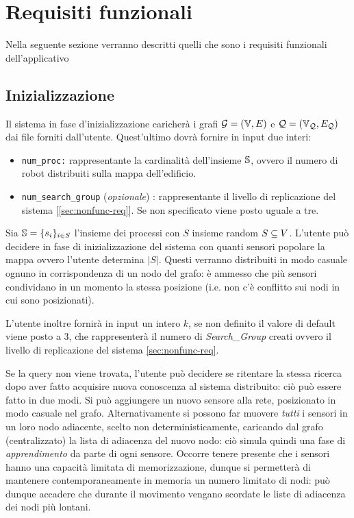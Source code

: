 \documentclass{llncs}
\begin{document}
\section{Requisiti funzionali}
Nella seguente sezione verranno descritti quelli che sono i requisiti funzionali dell'applicativo
\subsection{Inizializzazione}
Il sistema in fase d'inizializzazione caricherà i grafi $\mathcal{G} = ( \mathbb{V}, E)$ e $\mathcal{Q} = (\mathbb{V}_{\mathcal{Q}}, E_{\mathcal{Q}})$ dai 
file forniti dall'utente. Quest'ultimo dovrà fornire in input due interi:
\begin{itemize}
	\item \texttt{num\_proc:} rappresentante la cardinalità dell'insieme $\mathbb{S}$, ovvero il numero di 
	robot distribuiti sulla mappa dell'edificio.
	\item \texttt{num\_search\_group} (\emph{opzionale}) : rappresentante il livello di replicazione del sistema [\ref*{sec:nonfunc-req}]. Se non specificato viene posto uguale a tre.
\end{itemize} 



Sia $\mathbb{S} = \{s_i \}_{i \in S}$ l'insieme dei processi con $S$ insieme random $S \subseteq V$.
L'utente può decidere in fase di inizializzazione del sistema con quanti
sensori popolare la mappa ovvero l'utente determina $|S|$.
 Questi verranno distribuiti in modo casuale
ognuno in corrispondenza di un nodo del grafo: è ammesso che più
sensori condividano in un momento la stessa posizione
(i.e. non c'è conflitto sui nodi in cui sono posizionati). 

L'utente inoltre fornirà in input un intero $k$, se non definito il valore di  default 
viene posto a 3, che rappresenterà il numero di  \emph{Search\_Group} creati ovvero il livello
di replicazione del sistema \ref{sec:nonfunc-req}. 

Se la query non viene trovata, l'utente può decidere se ritentare
la stessa ricerca dopo aver fatto acquisire nuova conoscenza al sistema
distribuito: ciò può essere fatto in due modi.
Si può aggiungere un nuovo sensore alla rete, posizionato in modo
casuale nel grafo. Alternativamente
si possono far muovere \emph{tutti} i sensori in un loro nodo adiacente,
scelto non deterministicamente, caricando dal grafo (centralizzato)
la lista di adiacenza del nuovo nodo: ciò simula quindi una fase di
\emph{apprendimento} da parte di ogni sensore. Occorre tenere presente
che i sensori hanno una capacità limitata di memorizzazione,
dunque si permetterà di mantenere contemporaneamente in memoria un
numero limitato di nodi: può dunque accadere che durante il movimento
vengano scordate le liste di adiacenza dei nodi più lontani.
\\
\end{document}
